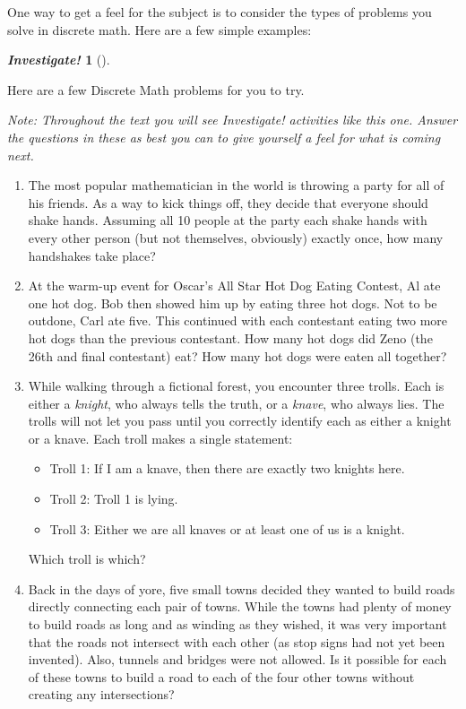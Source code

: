 \documentclass[10pt,]{book}
\theoremstyle{plain}
\theoremstyle{definition}
\theoremstyle{definition}
\newtheorem{activity}[project]{\emph{Investigate!}}
\theoremstyle{definition}
\numberwithin{equation}{section}
\begin{document}
    One way to get a feel for the subject is to consider the types of problems you solve in discrete math. Here are a few simple examples:
\begin{activity}[]\label{activity-1}

      Here are a few Discrete Math problems for you to try.
\par

      \emph{Note: Throughout the text you will see \emph{Investigate!} activities like this one. Answer the questions in these as best you can to give yourself a feel for what is coming next.}
\leavevmode%
\begin{enumerate}
\item\hypertarget{li-1}{}
        The most popular mathematician in the world is throwing a party for all of his friends. As a way to kick things off, they decide that everyone should shake hands. Assuming all 10 people at the party each shake hands with every other person (but not themselves,
        obviously) exactly once, how many handshakes take place?
      \item\hypertarget{li-2}{}
        At the warm-up event for Oscar's All Star Hot Dog Eating Contest, Al ate one hot dog. Bob then showed him up by eating three hot dogs. Not to be outdone, Carl ate five. This continued with each contestant eating two more hot dogs than the previous contestant.
        How many hot dogs did Zeno (the 26th and final contestant) eat? How many hot dogs were eaten all together?
      \item\hypertarget{li-3}{}
        While walking through a fictional forest, you encounter three trolls. Each is either a \emph{knight}, who always tells the truth, or a \emph{knave}, who always lies. The trolls will not let you pass until you correctly identify each as either
        a knight or a knave. Each troll makes a single statement:


        \begin{itemize}[label=\textbullet]
\item{}Troll 1: If I am a knave, then there are exactly two knights here.\item{}Troll 2: Troll 1 is lying.\item{}Troll 3: Either we are all knaves or at least one of us is a knight.\end{itemize}



        Which troll is which?
      \item\hypertarget{li-7}{}
        Back in the days of yore, five small towns decided they wanted to build roads directly connecting each pair of towns. While the towns had plenty of money to build roads as long and as winding as they wished, it was very important that the roads not intersect
        with each other (as stop signs had not yet been invented). Also, tunnels and bridges were not allowed. Is it possible for each of these towns to build a road to each of the four other towns without creating any intersections?
      \end{enumerate}
\end{activity}
\par
\end{document}
